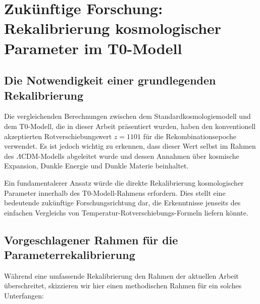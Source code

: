 \documentclass[12pt,a4paper]{article}
\begin{document}
	\section{Zukünftige Forschung: Rekalibrierung kosmologischer Parameter im T0-Modell}
	\label{sec:future_research}
	
	\subsection{Die Notwendigkeit einer grundlegenden Rekalibrierung}
	\label{subsec:need_recalibration}
	
	Die vergleichenden Berechnungen zwischen dem Standardkosmologiemodell und dem T0-Modell, die in dieser Arbeit präsentiert wurden, haben den konventionell akzeptierten Rotverschiebungswert $z = 1101$ für die Rekombinationsepoche verwendet. Es ist jedoch wichtig zu erkennen, dass dieser Wert selbst im Rahmen des $\Lambda$CDM-Modells abgeleitet wurde und dessen Annahmen über kosmische Expansion, Dunkle Energie und Dunkle Materie beinhaltet.
	
	Ein fundamentalerer Ansatz würde die direkte Rekalibrierung kosmologischer Parameter innerhalb des T0-Modell-Rahmens erfordern. Dies stellt eine bedeutende zukünftige Forschungsrichtung dar, die Erkenntnisse jenseits des einfachen Vergleichs von Temperatur-Rotverschiebungs-Formeln liefern könnte.
	
	\subsection{Vorgeschlagener Rahmen für die Parameterrekalibrierung}
	\label{subsec:recalibration_framework}
	
	Während eine umfassende Rekalibrierung den Rahmen der aktuellen Arbeit überschreitet, skizzieren wir hier einen methodischen Rahmen für ein solches Unterfangen:
	
\end{document}
